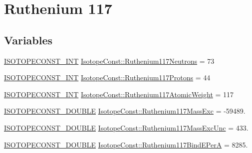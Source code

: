 \hypertarget{group___isotope_const-_ruthenium-_ru117}{}\section{Ruthenium 117}
\label{group___isotope_const-_ruthenium-_ru117}
\subsection*{Variables}
\begin{DoxyCompactItemize}
\item 
\mbox{\hyperlink{group___isotope_const-_macros_ga5f18360b3e99483a35c32d789e62621c}{I\+S\+O\+T\+O\+P\+E\+C\+O\+N\+S\+T\+\_\+\+I\+NT}} \mbox{\hyperlink{group___isotope_const-_ruthenium-_ru117_ga5f096b1c8adeeeb4fb114186076a2be2}{Isotope\+Const\+::\+Ruthenium117\+Neutrons}} = 73
\item 
\mbox{\hyperlink{group___isotope_const-_macros_ga5f18360b3e99483a35c32d789e62621c}{I\+S\+O\+T\+O\+P\+E\+C\+O\+N\+S\+T\+\_\+\+I\+NT}} \mbox{\hyperlink{group___isotope_const-_ruthenium-_ru117_ga1d8cb203252cd2c24c16d75d36902445}{Isotope\+Const\+::\+Ruthenium117\+Protons}} = 44
\item 
\mbox{\hyperlink{group___isotope_const-_macros_ga5f18360b3e99483a35c32d789e62621c}{I\+S\+O\+T\+O\+P\+E\+C\+O\+N\+S\+T\+\_\+\+I\+NT}} \mbox{\hyperlink{group___isotope_const-_ruthenium-_ru117_ga7575e9ef31a86c38c043c84706883006}{Isotope\+Const\+::\+Ruthenium117\+Atomic\+Weight}} = 117
\item 
\mbox{\hyperlink{group___isotope_const-_macros_ga8f45a7272ce02c0b4c65c44636ed719a}{I\+S\+O\+T\+O\+P\+E\+C\+O\+N\+S\+T\+\_\+\+D\+O\+U\+B\+LE}} \mbox{\hyperlink{group___isotope_const-_ruthenium-_ru117_gafac9938f11ea48480dd258442f74b254}{Isotope\+Const\+::\+Ruthenium117\+Mass\+Exc}} = -\/59489.
\item 
\mbox{\hyperlink{group___isotope_const-_macros_ga8f45a7272ce02c0b4c65c44636ed719a}{I\+S\+O\+T\+O\+P\+E\+C\+O\+N\+S\+T\+\_\+\+D\+O\+U\+B\+LE}} \mbox{\hyperlink{group___isotope_const-_ruthenium-_ru117_ga8b456cc38d8c15a4cd19f65eb664d997}{Isotope\+Const\+::\+Ruthenium117\+Mass\+Exc\+Unc}} = 433.
\item 
\mbox{\hyperlink{group___isotope_const-_macros_ga8f45a7272ce02c0b4c65c44636ed719a}{I\+S\+O\+T\+O\+P\+E\+C\+O\+N\+S\+T\+\_\+\+D\+O\+U\+B\+LE}} \mbox{\hyperlink{group___isotope_const-_ruthenium-_ru117_gace98c4269b066d8d6ec1d78df829b30f}{Isotope\+Const\+::\+Ruthenium117\+Bind\+E\+PerA}} = 8285.
\item 

\end{DoxyCompactItemize}
